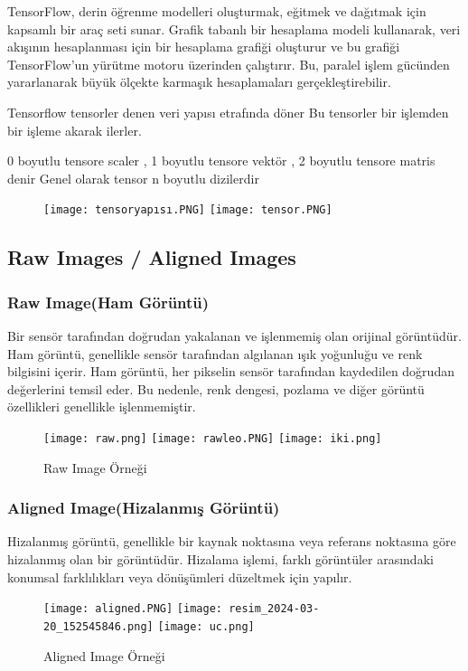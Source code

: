 \documentclass[12pt]{article}
\begin{document}
TensorFlow, derin öğrenme modelleri oluşturmak, eğitmek ve dağıtmak için kapsamlı bir araç seti sunar. Grafik tabanlı bir hesaplama modeli kullanarak, veri akışının hesaplanması için bir hesaplama grafiği oluşturur ve bu grafiği TensorFlow'un yürütme motoru üzerinden çalıştırır. Bu, paralel işlem gücünden yararlanarak büyük ölçekte karmaşık hesaplamaları gerçekleştirebilir.

Tensorflow tensorler denen veri yapısı etrafında döner 
Bu tensorler bir işlemden bir işleme akarak ilerler.

0 boyutlu tensore scaler ,
1 boyutlu tensore vektör ,
2 boyutlu tensore matris denir 
Genel olarak tensor n boyutlu dizilerdir 

\begin{figure}[h]
    \centering
    \texttt{[image: tensoryapısı.PNG]}   \texttt{[image: tensor.PNG]}
    \label{fig:enter-label}
\end{figure} 
\subsection{Raw Images / Aligned Images }
\subsubsection{Raw Image(Ham Görüntü)}
Bir sensör tarafından doğrudan yakalanan ve işlenmemiş olan orijinal görüntüdür.
Ham görüntü, genellikle sensör tarafından algılanan ışık yoğunluğu ve renk bilgisini içerir.
Ham görüntü, her pikselin sensör tarafından kaydedilen doğrudan değerlerini temsil eder. Bu nedenle, renk dengesi, pozlama ve diğer görüntü özellikleri genellikle işlenmemiştir.
\begin{figure}[h]
    \centering
    \texttt{[image: raw.png]}
    \texttt{[image: rawleo.PNG]}
    \texttt{[image: iki.png]}
    \caption{Raw Image Örneği }
    \label{fig:enter-label}
\end{figure} 
\newpage

\subsubsection{Aligned Image(Hizalanmış Görüntü)}
Hizalanmış görüntü, genellikle bir kaynak noktasına veya referans noktasına göre hizalanmış olan bir görüntüdür.
Hizalama işlemi, farklı görüntüler arasındaki konumsal farklılıkları veya dönüşümleri düzeltmek için yapılır.
\begin{figure}[h]
    \centering
    \texttt{[image: aligned.PNG]}
    \texttt{[image: resim\_2024-03-20\_152545846.png]}
    \texttt{[image: uc.png]}
    \caption{Aligned Image Örneği}
    \label{fig:enter-label}
\end{figure} \newpage
\end{document}
